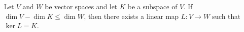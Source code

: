 Let $V$ and $W$ be vector spaces and let $K$ be a subspace of $V$. If $\dim V - \dim K \leq \dim W$, then there exists a linear map $L: V \rightarrow W$ such that $\ker L = K$.

